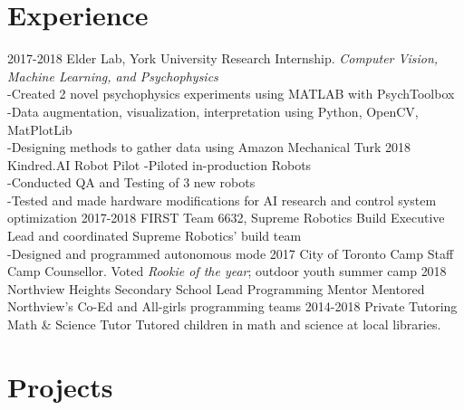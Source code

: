 \documentclass[]{chandan-cv}
\begin{document}
\section{Experience}

\begin{entrylist}
  \entry
    {2017-2018}
    {Elder Lab, York University}
    {Research Internship.}
    {\emph{Computer Vision, Machine Learning, and Psychophysics}
\\-Created 2 novel psychophysics experiments using MATLAB with PsychToolbox
\\-Data augmentation, visualization, interpretation using Python, OpenCV, MatPlotLib
\\-Designing methods to gather data using Amazon Mechanical Turk}
  \entry
    {2018}
    {Kindred.AI}
    {Robot Pilot}
    {-Piloted in-production Robots
\\-Conducted QA and Testing of 3 new robots
\\-Tested and made hardware modifications for AI research and control system optimization}
  \entry
    {2017-2018}
    {FIRST Team 6632, Supreme Robotics}
    {Build Executive}
    {Lead and coordinated Supreme Robotics' build team
\\-Designed and programmed autonomous mode}
  \entry
    {2017}
    {City of Toronto Camp Staff}
    {Camp Counsellor.}
    {Voted \emph{Rookie of the year}; outdoor youth summer camp}
  \entry
    {2018}
    {Northview Heights Secondary School}
    {Lead Programming Mentor}
    {Mentored Northview's Co-Ed and All-girls programming teams}
  \entry
    {2014-2018}
    {Private Tutoring}
    {Math \& Science Tutor}
    {Tutored children in math and science at local libraries.}
\end{entrylist}

\section{Projects}
\end{document}
